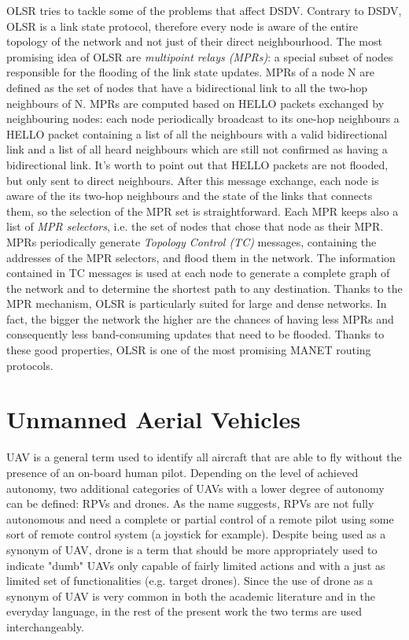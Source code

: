 \gls{OLSR} tries to tackle some of the problems that affect \gls{DSDV}. Contrary to \gls{DSDV}, \gls{OLSR} is a link state protocol, therefore every node is aware of the entire topology of the network and not just of their direct neighbourhood. The most promising idea of \gls{OLSR} are \textit{multipoint relays (MPRs)}: a special subset of nodes responsible for the flooding of the link state updates. MPRs of a node N are defined as the set of nodes that have a bidirectional link to all the two-hop neighbours of N. MPRs are computed based on HELLO packets exchanged by neighbouring nodes: each node periodically broadcast to its one-hop neighbours a HELLO packet containing a list of all the neighbours with a valid bidirectional link and a list of all heard neighbours which are still not confirmed as having a bidirectional link. It's worth to point out that HELLO packets are not flooded, but only sent to direct neighbours. After this message exchange, each node is aware of the its two-hop neighbours and the state of the links that connects them, so the selection of the MPR set is straightforward. Each MPR keeps also a list of \textit{MPR selectors}, i.e. the set of nodes that chose that node as their MPR. MPRs periodically generate \textit{Topology Control (TC)} messages, containing the addresses of the MPR selectors, and flood them in the network. The information contained in TC messages is used at each node to generate a complete graph of the network and to determine the shortest path to any destination. Thanks to the MPR mechanism, \gls{OLSR} is particularly suited for large and dense networks. In fact, the bigger the network the higher are the chances of having less MPRs and consequently less band-consuming updates that need to be flooded. Thanks to these good properties, \gls{OLSR} is one of the most promising \gls{MANET} routing protocols.  

\section{Unmanned Aerial Vehicles}

\gls{UAV} is a general term used to identify all aircraft that are able to fly without the presence of an on-board human pilot. Depending on the level of achieved autonomy, two additional categories of \glspl{UAV} with a lower degree of autonomy can be defined: \glspl{RPV} and drones. As the name suggests, \glspl{RPV} are not fully autonomous and need a complete or partial control of a remote pilot using some sort of remote control system (a joystick for example). Despite being used as a synonym of \gls{UAV}, drone is a term that should be more appropriately used to indicate "dumb" \glspl{UAV} only capable of fairly limited actions and with a just as limited set of functionalities (e.g. target drones). Since the use of drone as a synonym of \gls{UAV} is very common in both the academic literature and in the everyday language, in the rest of the present work the two terms are used interchangeably. 

